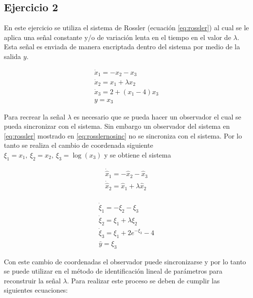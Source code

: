 \subsection*{Ejercicio 2}

En este ejercicio se utiliza el sistema de Rossler (ecuación \ref{eq:rossler}) al cual se le aplica una señal constante y/o de variación lenta en el tiempo en el valor de $\lambda$. Esta señal es enviada de manera encriptada dentro del sistema por medio de la salida $y$.

\begin{equation}\label{eq:rossler}
	\begin{array}{c}
		\dot{x}_1 = -x_2 - x_3\\
		\dot{x}_2 = x_1 + \lambda x_2\\
		\dot{x}_3 = 2 + (x_1 - 4)x_3\\
		y = x_3
	\end{array}
\end{equation}

Para recrear la señal $\lambda$ es necesario que se pueda hacer un observador el cual se pueda sincronizar con el sistema. Sin embargo un observador del sistema en \ref{eq:rossler} mostrado en \ref{eq:rosslernosinc} no se sincroniza con el sistema. Por lo tanto se realiza el cambio de coordenada siguiente $\xi_1 = x_1, \ \xi_2 = x_2, \ \xi_3 = \log(x_3) $ y se obtiene el sistema 

\begin{equation}\label{eq:rosslernosinc}
	\begin{array}{c}
		\dot{\hat{x}}_1 = -\hat{x}_2 - \hat{x}_3\\
		\dot{\hat{x}}_2 = \hat{x}_1 + \lambda \hat{x}_2\\
	\end{array}
\end{equation}

\begin{equation}\label{eq:rosslercambiocoord}
	\begin{array}{c}
		\dot{\xi}_1 = -\xi_2 - \xi_3\\
		\dot{\xi}_2 = \xi_1 + \lambda \xi_2\\
		\dot{\xi}_3 = \xi_1 + 2e^{-\xi_3} - 4\\
		\bar{y} = \xi_3
	\end{array}
\end{equation}

Con este cambio de coordenadas el observador puede sincronizarse y por lo tanto se puede utilizar en el método de identificación lineal de parámetros para reconstruir la señal $\lambda$. Para realizar este proceso se deben de cumplir las siguientes ecuaciones:

